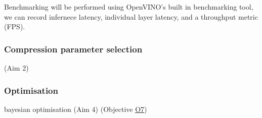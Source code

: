 \documentclass[../D1.tex]{subfiles}
\begin{document}
Benchmarking will be performed using OpenVINO's built in benchmarking tool, we can record infernece latency, individual layer latency, and a throughput metric (FPS). 


\subsubsection{Compression parameter selection}
(Aim 2)

\subsubsection{Optimisation}
bayesian optimisation \autocite{snoekPracticalBayesianOptimization2012}
(Aim 4)
(Objective \hyperref[obj:CompPara]{O7})
\end{document}
